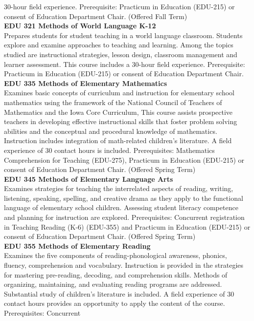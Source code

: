 \documentclass[
  letterpaper,
]{scrbook}
\begin{document}
30-hour field experience. Prerequisite: Practicum in Education (EDU-215)
or consent of Education Department Chair. (Offered Fall Term)\\
\textbf{EDU 321 Methods of World Language K-12}\\
Prepares students for student teaching in a world language classroom.
Students explore and examine approaches to teaching and learning. Among
the topics studied are instructional strategies, lesson design,
classroom management and learner assessment. This course includes a
30-hour field experience. Prerequisite: Practicum in Education (EDU-215)
or consent of Education Department Chair.\\
\textbf{EDU 335 Methods of Elementary Mathematics}\\
Examines basic concepts of curriculum and instruction for elementary
school mathematics using the framework of the National Council of
Teachers of Mathematics and the Iowa Core Curriculum, This course
assists prospective teachers in developing effective instructional
skills that foster problem solving abilities and the conceptual and
procedural knowledge of mathematics. Instruction includes integration of
math-related children's literature. A field experience of 30 contact
hours is included. Prerequisites: Mathematics Comprehension for Teaching
(EDU-275), Practicum in Education (EDU-215) or consent of Education
Department Chair. (Offered Spring Term)\\
\textbf{EDU 345 Methods of Elementary Language Arts}\\
Examines strategies for teaching the interrelated aspects of reading,
writing, listening, speaking, spelling, and creative drama as they apply
to the functional language of elementary school children. Assessing
student literacy competence and planning for instruction are explored.
Prerequisites: Concurrent registration in Teaching Reading (K-6)
(EDU-355) and Practicum in Education (EDU-215) or consent of Education
Department Chair. (Offered Spring Term)\\
\textbf{EDU 355 Methods of Elementary Reading}\\
Examines the five components of reading-phonological awareness, phonics,
fluency, comprehension and vocabulary. Instruction is provided in the
strategies for mastering pre-reading, decoding, and comprehension
skills. Methods of organizing, maintaining, and evaluating reading
programs are addressed. Substantial study of children's literature is
included. A field experience of 30 contact hours provides an opportunity
to apply the content of the course. Prerequisites: Concurrent
\end{document}
